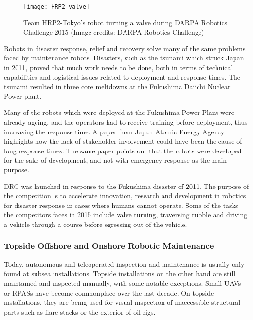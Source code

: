 \begin{wrapfigure}{r}{0.5\textwidth}
	\begin{center}
		\texttt{[image: HRP2\_valve]}
	\end{center}
	
	\caption{Team HRP2-Tokyo's robot turning a valve during DARPA Robotics Challenge 2015 (Image credits: DARPA Robotics Challenge)}
\end{wrapfigure}

Robots in disaster response, relief and recovery solve many of the same problems faced by maintenance robots. Disasters, such as the tsunami which struck Japan in 2011, proved that much work needs to be done, both in terms of technical capabilities and logistical issues related to deployment and response times. The tsunami resulted in three core meltdowns at the Fukushima Daiichi Nuclear Power plant.

Many of the robots which were deployed at the Fukushima Power Plant were already ageing, and the operators had to receive training before deployment, thus increasing the response time\cite{doi:10.1108/01439911211249715}. A paper from Japan Atomic Energy Agency\cite{doi:10.1108/01439911211249715} highlights how the lack of stakeholder involvement could have been the cause of long response times. The same paper points out that the robots were developed for the sake of development, and not with emergency response as the main purpose\cite{doi:10.1108/01439911211249715}. 

\ac{DRC}\cite{DRC} was launched in response to the Fukushima disaster of 2011. The purpose of the competition is to accelerate innovation, research and development in robotics for disaster response in cases where humans cannot operate. Some of the tasks the competitors faces in 2015 include valve turning, traversing rubble and driving a vehicle through a course before egressing out of the vehicle.

\subsubsection{Topside Offshore and Onshore Robotic Maintenance}

Today, autonomous and teleoperated inspection and maintenance is usually only found at subsea installations. Topside installations on the other hand are still maintained and inspected manually, with some notable exceptions. Small \acp{UAV} or \acp{RPAS} have become commonplace over the last decade. On topside installations, they are being used for visual inspection of inaccessible structural parts such as flare stacks or the exterior of oil rigs.


